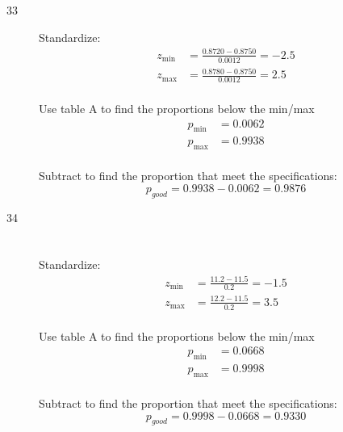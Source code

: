 \documentclass[letterpaper, landscape]{exam}
\begin{document}
\begin{description}


      \item[33]
        Standardize:
        \begin{align*}
          z_{\min} & = \frac{0.8720 - 0.8750}{0.0012} = -2.5 \\
          z_{\max} & = \frac{0.8780 - 0.8750}{0.0012} = 2.5 \\
        \end{align*}

        Use table A to find the proportions below the min/max
        \begin{align*}
          p_{\min} & = 0.0062 \\
          p_{\max} & = 0.9938 \\
        \end{align*}

        Subtract to find the proportion that meet the specifications:
        \[
          p_{good} = 0.9938 - 0.0062 = \boxed{ 0.9876 }
        \]

      \item[34]
        \begin{parts}
          
          \part{}
            Standardize:
            \begin{align*}
              z_{\min} &= \frac{11.2 - 11.5}{0.2} = -1.5 \\
              z_{\max} &= \frac{12.2 - 11.5}{0.2} = 3.5 \\
            \end{align*}

            Use table A to find the proportions below the min/max
            \begin{align*}
              p_{\min} & = 0.0668 \\
              p_{\max} & = 0.9998 \\
            \end{align*}

            Subtract to find the proportion that meet the specifications:
            \[
              p_{good} = 0.9998 - 0.0668 = \boxed{ 0.9330 }
            \]


\end{parts}
\end{description}
\end{document}

